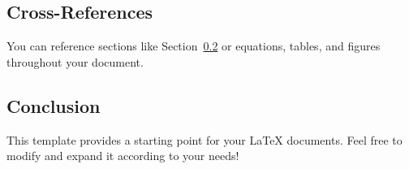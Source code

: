 \subsection{Cross-References}

You can reference sections like Section~\ref{sec:conclusion} or equations, tables, and figures throughout your document.

\subsection{Conclusion}
\label{sec:conclusion}

This template provides a starting point for your LaTeX documents. Feel free to modify and expand it according to your needs!
